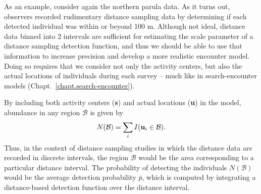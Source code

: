 As an example, consider again the northern parula data.
As it turns out, %
observers recorded rudimentary distance sampling data by determining
if each detected
individual was within or beyond 100 m. Although not ideal, distance
data binned into 2 intervals are sufficient for estimating the scale
parameter of a distance sampling detection function, and thus we
should be able to use that information to increase precision
and
develop a more realistic encounter model. %
Doing so requires that we consider not only the activity centers,
but also the actual locations of individuals during each survey --
much like in search-encounter models
(Chapt.~\ref{chapt.search-encounter}). %

By including both activity centers ({\bf s}) and actual locations
({\bf u}) in the model, abundance in any region
$\mathcal{B}$ is given by
\begin{equation}
N(\mathcal{B}) = \sum_i I({\bf u}_i \in \mathcal{B}).
\label{unmarked.eq.B}
\end{equation}
Thus, in the context of distance sampling studies in which the
distance data are recorded in discrete intervals, the region
$\mathcal{B}$ would be the area corresponding to a particular distance
interval. The probability of detecting the individuals
$N(\mathcal{B})$ would be the average detection probability $\bar{p}$,
which is computed by integrating a distance-based detection function
over the distance interval.

